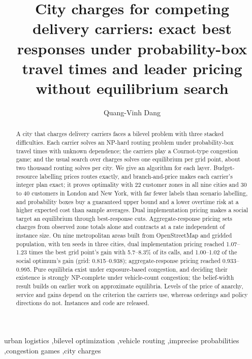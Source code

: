 \documentclass[preprint,11pt]{elsarticle}
\theoremstyle{definition}
\theoremstyle{remark}
\begin{document}
\begin{frontmatter}

\title{City charges for competing delivery carriers: exact best responses under probability-box travel times and leader pricing without equilibrium search}

\author{Quang-Vinh Dang}
\address{British University Vietnam, Hung Yen, Vietnam. ORCID 0000-0002-3877-8024}

\begin{abstract}
A city that charges delivery carriers faces a bilevel problem with three stacked difficulties. Each carrier solves an NP-hard routing problem under probability-box travel times with unknown dependence; the carriers play a Cournot-type congestion game; and the usual search over charges solves one equilibrium per grid point, about two thousand routing solves per city. We give an algorithm for each layer. Budget-resource labelling prices routes exactly, and branch-and-price makes each carrier's integer plan exact; it proves optimality with 22 customer zones in all nine cities and 30 to 40 customers in London and New York, with far fewer labels than scenario labelling, and probability boxes buy a guaranteed upper bound and a lower overtime risk at a higher expected cost than sample averages. Dual implementation pricing makes a social target an equilibrium through best-response cuts. Aggregate-response pricing sets charges from observed zone totals alone and contracts at a rate independent of instance size. On nine metropolitan areas built from OpenStreetMap and gridded population, with ten seeds in three cities, dual implementation pricing reached 1.07--1.23 times the best grid point's gain with 5.7--8.3\% of its calls, and 1.00--1.02 of the social optimum's gain (grid: 0.815--0.938); aggregate-response pricing reached 0.933--0.995. Pure equilibria exist under exposure-based congestion, and deciding their existence is strongly NP-complete under vehicle-count congestion; the belief-width result builds on earlier work on approximate equilibria. Levels of the price of anarchy, service and gains depend on the criterion the carriers use, whereas orderings and policy directions do not. Instances and code are released.
\end{abstract}

\begin{keyword}
urban logistics \sep bilevel optimization \sep vehicle routing \sep imprecise probabilities \sep congestion games \sep city charges
\end{keyword}

\end{frontmatter}
\end{document}
